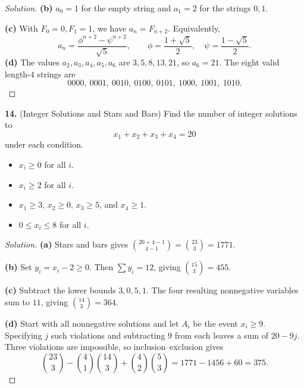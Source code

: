 \documentclass[12pt]{amsart}
\newenvironment{solution}
{\begin{proof}[Solution]}
{\end{proof}}
\begin{document}
\begin{onehalfspace}
\begin{solution}
            \textbf{(b)} $a_0=1$ for the empty string and $a_1=2$ for
            the strings $0,1$.

            \textbf{(c)} With $F_0=0,F_1=1$, we have $a_n=F_{n+2}$.
            Equivalently,
            \[
                a_n=\frac{\phi^{n+2}-\psi^{n+2}}{\sqrt5},\qquad
                \phi=\frac{1+\sqrt5}{2},\quad
                \psi=\frac{1-\sqrt5}{2}.
            \]
            \textbf{(d)} The values $a_2,a_3,a_4,a_5,a_6$ are
            $3,5,8,13,21$, so $a_6=21$. The eight valid length-$4$ strings are
            \[
                0000,\ 0001,\ 0010,\ 0100,\ 0101,\ 1000,\ 1001,\ 1010.
            \]
        \end{solution}

        \noindent\textbf{14.} (Integer Solutions and Stars and Bars) Find the number of integer
        solutions to
        \[
            x_1 + x_2 + x_3 + x_4 = 20
        \]
        under each condition.
        \begin{itemize}
            \item[(a)] $x_i \ge 0$ for all $i$.
            \item[(b)] $x_i \ge 2$ for all $i$.
            \item[(c)] $x_1 \ge 3$, $x_2 \ge 0$, $x_3 \ge 5$, and $x_4 \ge 1$.
            \item[(d)] $0 \le x_i \le 8$ for all $i$.
        \end{itemize}

        \begin{solution}
            \textbf{(a)} Stars and bars gives
            $\binom{20+4-1}{4-1}=\binom{23}{3}=1771$.

            \textbf{(b)} Set $y_i=x_i-2\ge0$. Then $\sum y_i=12$,
            giving $\binom{15}{3}=455$.

            \textbf{(c)} Subtract the lower bounds $3,0,5,1$.
            The four resulting nonnegative variables sum to $11$,
            giving $\binom{14}{3}=364$.

            \textbf{(d)} Start with all nonnegative solutions and let
            $A_i$ be the event $x_i\ge9$. Specifying $j$ such violations
            and subtracting $9$ from each leaves a sum of $20-9j$.
            Three violations are impossible, so inclusion--exclusion gives
            \[
                \binom{23}{3}-\binom41\binom{14}{3}
                    +\binom42\binom53
                =1771-1456+60=375.
            \]
        \end{solution}


\end{onehalfspace}
\end{document}
